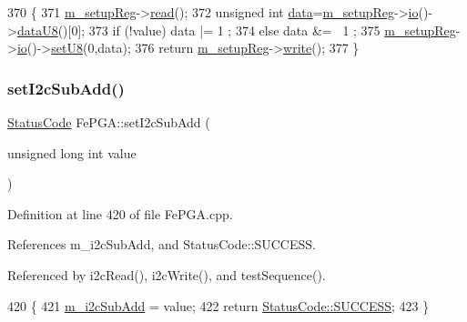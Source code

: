 \begin{DoxyCode}
370                                           \{
371   \hyperlink{classFePGA_a0255fe229013986b4387c3a75ddf4e97}{m\_setupReg}->\hyperlink{classIOobject_aa07610c11963b1db6710e3c76ceea456}{read}();
372   \textcolor{keywordtype}{unsigned} \textcolor{keywordtype}{int} \hyperlink{namespaceshell_a5ea2525995cedc3efd69ea8a7f034d1e}{data}=\hyperlink{classFePGA_a0255fe229013986b4387c3a75ddf4e97}{m\_setupReg}->\hyperlink{classIOobject_af04fb94137c3d86849f478ac5afab5d1}{io}()->\hyperlink{classIOdata_a75e9c318dbac3a39402179070943d4bc}{dataU8}()[0];
373   \textcolor{keywordflow}{if} (!value) data |= 1  ;
374   \textcolor{keywordflow}{else}        data &= ~1 ;
375   \hyperlink{classFePGA_a0255fe229013986b4387c3a75ddf4e97}{m\_setupReg}->\hyperlink{classIOobject_af04fb94137c3d86849f478ac5afab5d1}{io}()->\hyperlink{classIOdata_a6c4fb2f2af01889ada889c2b7aceb24d}{setU8}(0,data);
376   \textcolor{keywordflow}{return} \hyperlink{classFePGA_a0255fe229013986b4387c3a75ddf4e97}{m\_setupReg}->\hyperlink{classIOobject_a9f6984bc9f0fadcf800f1be2523ac744}{write}();
377 \}
\end{DoxyCode}
\mbox{\label{classFePGA_a37c1ee5bf89667c641f321479697166f}} 
\subsubsection{\texorpdfstring{set\+I2c\+Sub\+Add()}{setI2cSubAdd()}}
{\footnotesize\ttfamily \hyperlink{classStatusCode}{Status\+Code} Fe\+P\+G\+A\+::set\+I2c\+Sub\+Add (\begin{DoxyParamCaption}\item[{unsigned long int}]{value }\end{DoxyParamCaption})}



Definition at line 420 of file Fe\+P\+G\+A.\+cpp.



References m\+\_\+i2c\+Sub\+Add, and Status\+Code\+::\+S\+U\+C\+C\+E\+SS.



Referenced by i2c\+Read(), i2c\+Write(), and test\+Sequence().


\begin{DoxyCode}
420                                                        \{
421   \hyperlink{classFePGA_aba8c2c8d8e0d136826b9dd4c2d7c2e90}{m\_i2cSubAdd} = value;
422   \textcolor{keywordflow}{return} \hyperlink{classStatusCode_a6f565cbeadc76d14c72f047e5e85eb4badd0da38d3ba0d922efd1f4619bc37ad8}{StatusCode::SUCCESS};
423 \}
\end{DoxyCode}
\mbox{\label{classFePGA_a2cd235d1971625d6742d4f3107489a07}} 
